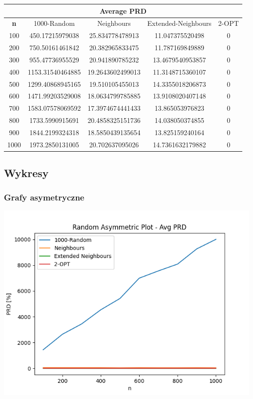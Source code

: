 \documentclass{article}
\begin{document}
\begin{center}
\begin{tabular}{|c|c|c|c|c|}
\hline
\multicolumn{5}{|c|}{\textbf{Average PRD}}\\
\hline
\textbf{n} & 1000-Random & Neighbours & Extended-Neighbours & 2-OPT\\
\hline
100 & 450.17215979038 & 25.834778478913 & 11.047375520498 & 0\\
\hline
200 & 750.50161461842 & 20.382965833475 & 11.787169849889 & 0\\
\hline
300 & 955.47736955529 & 20.941890785232 & 13.4679540953857 & 0\\
\hline
400 & 1153.31540464885 & 19.2643602499013 & 11.3148715360107 & 0\\
\hline
500 & 1299.40868945165 & 19.510105455013 & 14.3355018206873 & 0\\
\hline
600 & 1471.99203529008 & 18.0634799785885 & 13.9108020407148 & 0\\
\hline
700 & 1583.07578069592 & 17.3974674441433 & 13.865053976823 & 0\\
\hline
800 & 1733.5990915691 & 20.4858325151736 & 14.038050374855 & 0\\
\hline
900 & 1844.2199324318 & 18.5850439135654 & 13.825159240164 & 0\\
\hline
1000 & 1973.2850131005 & 20.702637095026 & 14.7361632179882 & 0\\
\hline
\end{tabular}
\end{center}


\subsection{Wykresy}

\subsubsection{Grafy asymetryczne}

\begin{center}
\includegraphics[width=\textwidth, 
                   height = 0.4\textheight, 
                   keepaspectratio]
                  {generated_asym_avg_prd} 
\end{center}
\end{document}
